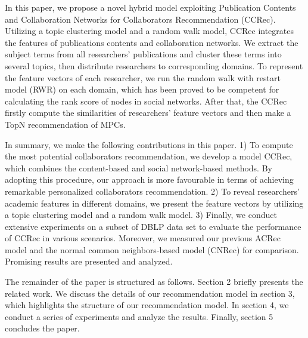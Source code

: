 \documentclass[review]{elsarticle}
\begin{document}
In this paper, we propose a novel hybrid model exploiting Publication Contents and Collaboration Networks for Collaborators Recommendation (CCRec). Utilizing a topic clustering model \cite{pan2010research} \cite{pham2011clustering} and a random walk model, CCRec integrates the features of publications contents and collaboration networks. We extract the subject terms from all researchers' publications and cluster these terms into several topics, then distribute researchers to corresponding domains. To represent the feature vectors of each researcher, we run the random walk with restart model (RWR) on each domain, which has been proved to be competent for calculating the rank score of nodes in social networks. After that, the CCRec firstly compute the similarities of researchers' feature vectors and then make a TopN recommendation of MPCs.

In summary, we make the following contributions in this paper. 1) To compute the most potential collaborators recommendation, we develop a model CCRec, which combines the content-based and social network-based methods. By adopting this procedure, our approach is more favourable in terms of achieving remarkable personalized collaborators recommendation. 2) To reveal researchers' academic features in different domains, we present the feature vectors by utilizing a topic clustering model and a random walk model. 3) Finally, we conduct extensive experiments on a subset of DBLP data set to evaluate the performance of CCRec in various scenarios. Moreover, we measured our previous ACRec model and the normal common neighbors-based model (CNRec) for comparison. Promising results are presented and analyzed.

The remainder of the paper is structured as follows. Section 2 briefly presents the related work. We discuss the details of our recommendation model in section 3, which highlights the structure of our recommendation model. In section 4, we conduct a series of experiments and analyze the results. Finally, section 5 concludes the paper.

\end{document}
